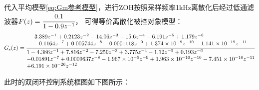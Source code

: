 代入平均模型\eqref{eq:Gm参考模型}，进行ZOH按照采样频率1kHz离散化后经过低通滤波器\(F(z)=\cfrac{0.1}{1-0.9z^{-1}}\)，
可得等价离散化被控对象模型：
\begin{equation*}
    G_{\mathrm{s}}(z)=
    \cfrac{
        \begin{array}[t]{@{}l@{}}
            3.389 z^{-1} + 0.2123 z^{-2} - 14.06 z^{-3} + 15.6 z^{-4} - 6.191 z^{-5} + 1.179 z^{-6} \\
            - 0.1164 z^{-7} + 0.005744 z^{-8} - 0.0001118 z^{-9} + 1.374\times 10^{-9}z^{-10} - 1.141\times 10^{-19}z^{-11}
        \end{array}}
        {
        \begin{array}[t]{@{}l@{}}
            1 - 4.386 z^{-1} + 7.816 z^{-2} - 7.259 z^{-3} + 3.775 z^{-4} - 1.12 z^{-5} + 0.193 z^{-6} \\
            - 0.01891 z^{-7} + 0.0009637 z^{-8} - 1.967\times 10^{-5} z^{-9} + 1.963\times 10^{-10} z^{-10} - 7.451\times 10^{-16} z^{-11} \\
            + 6.191\times 10^{-26}z^{-12}
        \end{array}}
\end{equation*}

此时的双闭环控制系统框图如下图所示：

